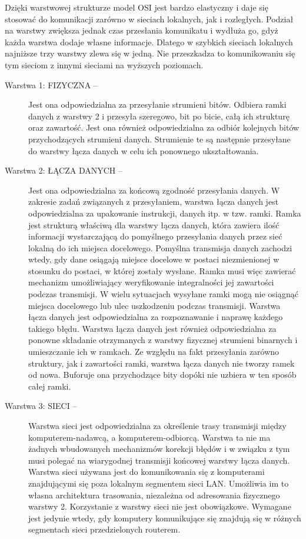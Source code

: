 \documentclass[a4paper, 10pt]{article}
\begin{document}
 Dzięki warstwowej strukturze model OSI jest bardzo elastyczny i daje się stosować do komunikacji zarówno w sieciach lokalnych, jak i rozległych. Podział na warstwy zwiększa jednak czas przesłania komunikatu i wydłuża go, gdyż każda warstwa dodaje własne informacje. Dlatego w szybkich sieciach lokalnych najniższe trzy warstwy zlewa się w jedną. Nie przeszkadza to komunikowaniu się tym sieciom z innymi sieciami na wyższych poziomach.
\begin{description}


  \item[Warstwa 1: FIZYCZNA -- ]{Jest ona odpowiedzialna za przesyłanie strumieni bitów. Odbiera ramki danych z warstwy 2 i przesyła szeregowo, bit po bicie, całą ich strukturę oraz zawartość. Jest ona również odpowiedzialna za odbiór kolejnych bitów przychodzących strumieni danych. Strumienie te są następnie przesyłane do warstwy łącza danych w celu ich ponownego ukształtowania.} 
 
  \item[Warstwa 2: ŁĄCZA DANYCH -- ]{Jest ona odpowiedzialna za końcową zgodność przesyłania danych. W zakresie zadań związanych z przesyłaniem, warstwa łącza danych jest odpowiedzialna za upakowanie instrukcji, danych itp. w tzw. ramki. Ramka jest strukturą właściwą dla warstwy łącza danych, która zawiera ilość informacji wystarczającą do pomyślnego przesyłania danych przez sieć lokalną do ich miejsca docelowego. Pomyślna transmisja danych zachodzi wtedy, gdy dane osiągają miejsce docelowe w postaci niezmienionej w stosunku do postaci, w której zostały wysłane. Ramka musi więc zawierać mechanizm umożliwiający weryfikowanie integralności jej zawartości podczas transmisji. W wielu sytuacjach wysyłane ramki mogą nie osiągnąć miejsca docelowego lub ulec uszkodzeniu podczas transmisji. Warstwa łącza danych jest odpowiedzialna za rozpoznawanie i naprawę każdego takiego błędu. Warstwa łącza danych jest również odpowiedzialna za ponowne składanie otrzymanych z warstwy fizycznej strumieni binarnych i umieszczanie ich w ramkach. Ze względu na fakt przesyłania zarówno struktury, jak i zawartości ramki, warstwa łącza danych nie tworzy ramek od nowa. Buforuje ona przychodzące bity dopóki nie uzbiera w ten sposób całej ramki.}
  
   \item[Warstwa 3: SIECI -- ]{Warstwa sieci jest odpowiedzialna za określenie trasy transmisji między komputerem-nadawcą, a komputerem-odbiorcą. Warstwa ta nie ma żadnych wbudowanych mechanizmów korekcji błędów i w związku z tym musi polegać na wiarygodnej transmisji końcowej warstwy łącza danych. Warstwa sieci używana jest do komunikowania się z komputerami znajdującymi się poza lokalnym segmentem sieci LAN. Umożliwia im to własna architektura trasowania, niezależna od adresowania fizycznego warstwy 2. Korzystanie z warstwy sieci nie jest obowiązkowe. Wymagane jest jedynie wtedy, gdy komputery komunikujące się znajdują się w różnych segmentach sieci przedzielonych routerem.
   
}
\end{description}
\end{document}
